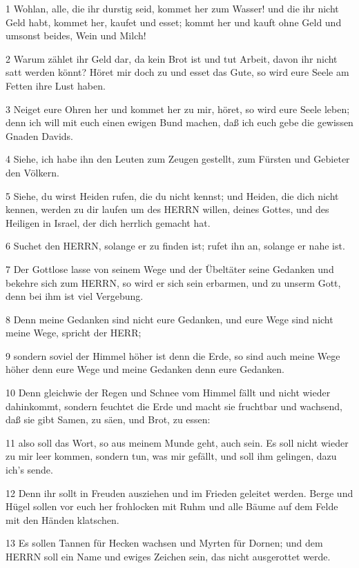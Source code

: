 \par 1 Wohlan, alle, die ihr durstig seid, kommet her zum Wasser! und die ihr nicht Geld habt, kommet her, kaufet und esset; kommt her und kauft ohne Geld und umsonst beides, Wein und Milch!
\par 2 Warum zählet ihr Geld dar, da kein Brot ist und tut Arbeit, davon ihr nicht satt werden könnt? Höret mir doch zu und esset das Gute, so wird eure Seele am Fetten ihre Lust haben.
\par 3 Neiget eure Ohren her und kommet her zu mir, höret, so wird eure Seele leben; denn ich will mit euch einen ewigen Bund machen, daß ich euch gebe die gewissen Gnaden Davids.
\par 4 Siehe, ich habe ihn den Leuten zum Zeugen gestellt, zum Fürsten und Gebieter den Völkern.
\par 5 Siehe, du wirst Heiden rufen, die du nicht kennst; und Heiden, die dich nicht kennen, werden zu dir laufen um des HERRN willen, deines Gottes, und des Heiligen in Israel, der dich herrlich gemacht hat.
\par 6 Suchet den HERRN, solange er zu finden ist; rufet ihn an, solange er nahe ist.
\par 7 Der Gottlose lasse von seinem Wege und der Übeltäter seine Gedanken und bekehre sich zum HERRN, so wird er sich sein erbarmen, und zu unserm Gott, denn bei ihm ist viel Vergebung.
\par 8 Denn meine Gedanken sind nicht eure Gedanken, und eure Wege sind nicht meine Wege, spricht der HERR;
\par 9 sondern soviel der Himmel höher ist denn die Erde, so sind auch meine Wege höher denn eure Wege und meine Gedanken denn eure Gedanken.
\par 10 Denn gleichwie der Regen und Schnee vom Himmel fällt und nicht wieder dahinkommt, sondern feuchtet die Erde und macht sie fruchtbar und wachsend, daß sie gibt Samen, zu säen, und Brot, zu essen:
\par 11 also soll das Wort, so aus meinem Munde geht, auch sein. Es soll nicht wieder zu mir leer kommen, sondern tun, was mir gefällt, und soll ihm gelingen, dazu ich's sende.
\par 12 Denn ihr sollt in Freuden ausziehen und im Frieden geleitet werden. Berge und Hügel sollen vor euch her frohlocken mit Ruhm und alle Bäume auf dem Felde mit den Händen klatschen.
\par 13 Es sollen Tannen für Hecken wachsen und Myrten für Dornen; und dem HERRN soll ein Name und ewiges Zeichen sein, das nicht ausgerottet werde.

